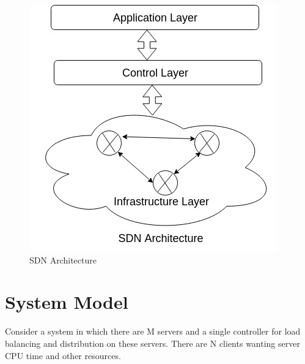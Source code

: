 \documentclass[letterpaper, 10 pt, conference]{IEEEtran}
\begin{document}
\begin{figure}[ht!]
\centering
\includegraphics[width=\linewidth]{SDN.jpeg}
\caption{SDN Architecture \label{fig:1}}
\end{figure}


\section{System Model}
\label{sec:system model}

Consider a system in which there are M servers and a single controller for load balancing and distribution on these servers. There are N  clients wanting server CPU time and other resources.
\end{document}
